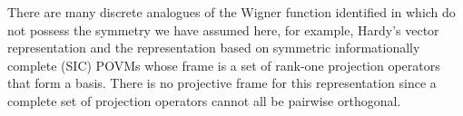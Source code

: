 There are many discrete analogues of the Wigner function identified in \cite{ferrie_quasi-probability_2011} which do not possess the symmetry we have assumed here, for example, Hardy's vector
representation \cite{hardy_quantum_2001} and the representation based on symmetric informationally complete (SIC) POVMs \cite{zauner_quantum_2011,renes_symmetric_2004} whose frame is a set of rank-one projection operators that form a basis. There is no projective frame for this representation since a complete set of projection operators cannot all be pairwise orthogonal. 